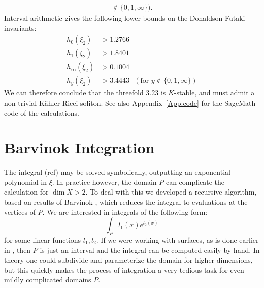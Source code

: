 \begin{example}
{\begin{align*}
\not \in \{0,1,\infty\} ).
\end{align*}}
Interval arithmetic gives the following lower bounds on the Donaldson-Futaki invariants:
\begin{align*}
h_0(\xi_2) &> 1.2766 \\
h_1(\xi_2) &> 1.8401 \\
h_\infty(\xi_2) &> 0.1004 \\
h_y(\xi_2) &> 3.4443 \ \ \  ( \text{for } y 
\not \in \{0,1,\infty\} )
\end{align*}
We can therefore conclude that the threefold 3.23 is \(K\)-stable, and must admit a non-trivial K\"ahler-Ricci soliton. See also Appendix~\ref{App:code} for the SageMath code of the calculations.
\end{example}

\section{Barvinok Integration} \label{sec:barvinok}
The integral (ref) may be solved symbolically, outputting an exponential polynomial in \(\xi\). In practice however, the domain \(P\) can complicate the calculation for \(\dim X > 2\). To deal with this we developed a recursive algorithm, based on results of Barvinok \cite{Barvinok1992}, which reduces the integral to evaluations at the vertices of \(P\). We are interested in integrals of the following form:
\begin{equation} \label{eq:barintegral1}
\int_{P} l_1(x) e^{l_2(x)}
\end{equation}
for some linear functions \(l_1,l_2\). If we were working with surfaces, as is done earlier in \cite{cable2018classification}, then \(P\) is just an interval and the integral can be computed easily by hand. In theory one could subdivide and parameterize the domain for higher dimensions, but this quickly makes the process of integration a very tedious task for even mildly complicated domains \(P\).


